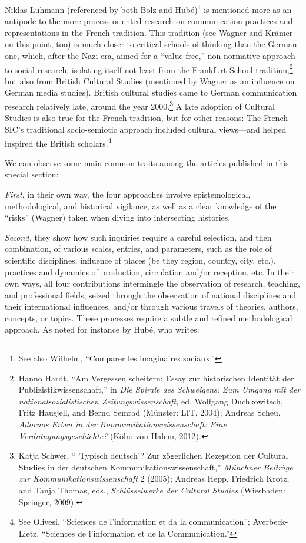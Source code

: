 \documentclass{tufte-handout}
\begin{document}
Niklas Luhmann (referenced by both Bolz and Hubé)\footnote{See also
  Wilhelm, ``Comparer les imaginaires sociaux.''} is mentioned more as
an antipode to the more process-oriented research on communication
practices and representations in the French tradition. This tradition
(see Wagner and Krämer on this point, too) is much closer to critical
schools of thinking than the German one, which, after the Nazi era,
aimed for a ``value free,'' non-normative approach to social research,
isolating itself not least from the Frankfurt School
tradition,\footnote{Hanno Hardt, ``Am Vergessen scheitern: Essay zur
  historischen Identität der Publizistikwissenschaft,'' in \emph{Die
  Spirale des Schweigens: Zum Umgang mit der nationalsozialistischen
  Zeitungswissenschaft,} ed. Wolfgang Duchkowitsch, Fritz Hausjell, and
  Bernd Semrad (Münster: LIT, 2004); Andreas Scheu, \emph{Adornos Erben
  in der Kommunikationswissenschaft: Eine Verdrängungsgeschichte?}
  (Köln: von Halem, 2012).} but also from British Cultural Studies
(mentioned by Wagner as an influence on German media studies). British
cultural studies came to German communication research relatively late,
around the year 2000.\footnote{Katja Schwer, ``\,`Typisch deutsch'? Zur
  zögerlichen Rezeption der Cultural Studies in der deutschen
  Kommunikationswissenschaft,'' \emph{Münchner Beiträge zur
  Kommunikationswissenschaft} 2
  (2005)\href{https://epub.ub.uni-muenchen.de/521/(29.12.2022);}{;}
  Andreas Hepp, Friedrich Krotz, and Tanja Thomas, eds.,
  \emph{Schlüsselwerke der Cultural Studies} (Wiesbaden: Springer,
  2009).} A late adoption of Cultural Studies is also true for the
French tradition, but for other reasons: The French SIC's traditional
socio-semiotic approach included cultural views---and helped inspired
the British scholars.\footnote{See Olivesi, ``Sciences de l'information
  et da la communication''; Averbeck-Lietz, ``Sciences de l'information
  et de la Communication.''}

We can observe some main common traits among the articles published in
this special section:

\emph{First}, in their own way, the four approaches involve
epistemological, methodological, and historical vigilance, as well as a
clear knowledge of the ``risks'' (Wagner) taken when diving into
intersecting histories.

\emph{Second,} they show how such inquiries require a careful selection,
and then combination, of various scales, entries, and parameters, such
as the role of scientific disciplines, influence of places (be they
region, country, city, etc.), practices and dynamics of production,
circulation and/or reception, etc. In their own ways, all four
contributions intermingle the observation of research, teaching, and
professional fields, seized through the observation of national
disciplines and their international influences, and/or through various
travels of theories, authors, concepts, or topics. These processes
require a subtle and refined methodological approach. As noted for
instance by Hubé, who writes:
\end{document}
